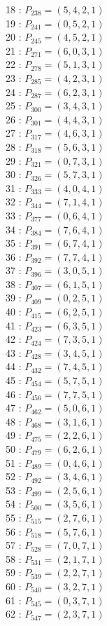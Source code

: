 \documentclass{article}
\begin{document}
{\begin{multicols}{2}
18 : $P_{238}=( 5, 4, 2, 1 )$\\
19 : $P_{241}=( 0, 5, 2, 1 )$\\
20 : $P_{245}=( 4, 5, 2, 1 )$\\
21 : $P_{271}=( 6, 0, 3, 1 )$\\
22 : $P_{278}=( 5, 1, 3, 1 )$\\
23 : $P_{285}=( 4, 2, 3, 1 )$\\
24 : $P_{287}=( 6, 2, 3, 1 )$\\
25 : $P_{300}=( 3, 4, 3, 1 )$\\
26 : $P_{301}=( 4, 4, 3, 1 )$\\
27 : $P_{317}=( 4, 6, 3, 1 )$\\
28 : $P_{318}=( 5, 6, 3, 1 )$\\
29 : $P_{321}=( 0, 7, 3, 1 )$\\
30 : $P_{326}=( 5, 7, 3, 1 )$\\
31 : $P_{333}=( 4, 0, 4, 1 )$\\
32 : $P_{344}=( 7, 1, 4, 1 )$\\
33 : $P_{377}=( 0, 6, 4, 1 )$\\
34 : $P_{384}=( 7, 6, 4, 1 )$\\
35 : $P_{391}=( 6, 7, 4, 1 )$\\
36 : $P_{392}=( 7, 7, 4, 1 )$\\
37 : $P_{396}=( 3, 0, 5, 1 )$\\
38 : $P_{407}=( 6, 1, 5, 1 )$\\
39 : $P_{409}=( 0, 2, 5, 1 )$\\
40 : $P_{415}=( 6, 2, 5, 1 )$\\
41 : $P_{423}=( 6, 3, 5, 1 )$\\
42 : $P_{424}=( 7, 3, 5, 1 )$\\
43 : $P_{428}=( 3, 4, 5, 1 )$\\
44 : $P_{432}=( 7, 4, 5, 1 )$\\
45 : $P_{454}=( 5, 7, 5, 1 )$\\
46 : $P_{456}=( 7, 7, 5, 1 )$\\
47 : $P_{462}=( 5, 0, 6, 1 )$\\
48 : $P_{468}=( 3, 1, 6, 1 )$\\
49 : $P_{475}=( 2, 2, 6, 1 )$\\
50 : $P_{479}=( 6, 2, 6, 1 )$\\
51 : $P_{489}=( 0, 4, 6, 1 )$\\
52 : $P_{492}=( 3, 4, 6, 1 )$\\
53 : $P_{499}=( 2, 5, 6, 1 )$\\
54 : $P_{500}=( 3, 5, 6, 1 )$\\
55 : $P_{515}=( 2, 7, 6, 1 )$\\
56 : $P_{518}=( 5, 7, 6, 1 )$\\
57 : $P_{528}=( 7, 0, 7, 1 )$\\
58 : $P_{531}=( 2, 1, 7, 1 )$\\
59 : $P_{539}=( 2, 2, 7, 1 )$\\
60 : $P_{540}=( 3, 2, 7, 1 )$\\
61 : $P_{545}=( 0, 3, 7, 1 )$\\
62 : $P_{547}=( 2, 3, 7, 1 )$\\
\end{multicols}
}
\end{document}

